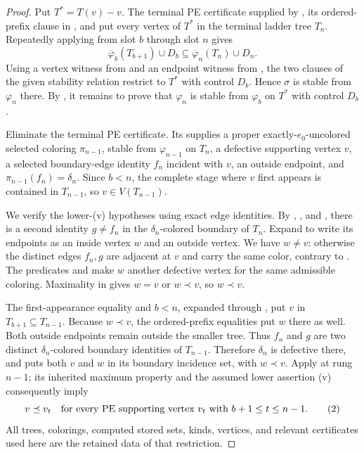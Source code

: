 \begin{proof}
Put \(T^*=T(v)-v\).  The terminal PE certificate supplied by
, its ordered-prefix clause in
, and
 put every vertex of \(T^*\) in the
terminal ladder tree \(T_n\).  Repeatedly applying
 from slot \(b\) through slot \(n\) gives
\[
 \overline\varphi_b(T_{b+1})\cup D_b
 \subseteq \overline\varphi_n(T_n)\cup D_n.                    \tag{1}
\]
Using a vertex witness from  and an endpoint
witness from , the two clauses of the given
stability relation restrict to \(T^*\) with control \(D_b\).  Hence
\(\sigma\) is stable from \(\varphi_n\) there.  By , it remains
to prove that \(\varphi_n\) is stable from \(\varphi_b\) on \(T^*\) with
control \(D_b\).

Eliminate the terminal PE certificate.  Its
 supplies a proper exactly-\(e_0\)-uncolored
selected coloring \(\pi_{n-1}\), stable from \(\varphi_{n-1}\) on \(T_n\),
a defective supporting vertex \(v\), a selected boundary-edge identity
\(f_n\) incident with \(v\), an outside endpoint, and
\(\pi_{n-1}(f_n)=\delta_n\).  Since \(b<n\), the complete stage where \(v\)
first appears is contained in \(T_{n-1}\), so \(v\in V(T_{n-1})\).

We verify the lower-(v) hypotheses using exact edge identities.  By
, , and
, there is a second identity \(g\ne f_n\) in the
\(\delta_n\)-colored boundary of \(T_n\).  Expand
 to write its endpoints as an inside vertex \(w\)
and an outside vertex.  We have \(w\ne v\): otherwise the distinct edges
\(f_n,g\) are adjacent at \(v\) and carry the same color, contrary to
.  The predicates
 and  make \(w\) another
defective vertex for the same admissible coloring.  Maximality in
 gives \(w=v\) or \(w\prec v\), so
\(w\prec v\).

The first-appearance equality and \(b<n\), expanded through
, put \(v\) in \(T_{b+1}\subseteq
T_{n-1}\).  Because \(w\prec v\), the ordered-prefix equalities put \(w\)
there as well.  Both outside endpoints remain outside the smaller tree.
Thus \(f_n\) and \(g\) are two distinct \(\delta_n\)-colored boundary
identities of \(T_{n-1}\).  Therefore \(\delta_n\) is defective there, and
 puts both \(v\) and \(w\) in its boundary
incidence set, with \(w\prec v\).  Apply
 at rung \(n-1\); its inherited maximum
property and the assumed lower assertion
(v) consequently imply
\[
 v\preceq v_t
 \quad\hbox{for every PE supporting vertex }v_t
 \hbox{ with }b+1\le t\le n-1.                                \tag{2}
\]
All trees, colorings, computed stored sets, kinds, vertices, and relevant
certificates used here are the retained data of that restriction.


\end{proof}

